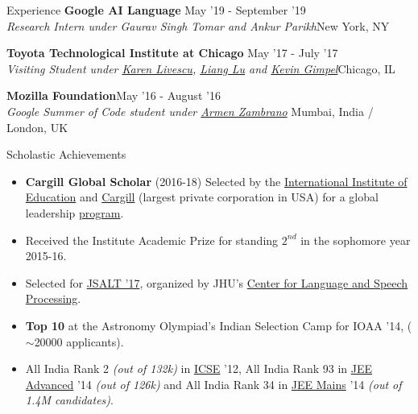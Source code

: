 \documentclass{resume} %
\begin{document}
\vspace*{-1.5mm}
\begin{rSection}{Experience}
{\bf Google AI Language}{ \hfill May '19 - September '19}\\ \textit{Research Intern under Gaurav Singh Tomar and Ankur Parikh}{\hfill New York, NY}

{\bf Toyota Technological Institute at Chicago}{ \hfill May '17 - July '17}\\ \textit{Visiting Student under \href{http://ttic.uchicago.edu/~klivescu/}{Karen Livescu}, \href{http://ttic.uchicago.edu/~llu/}{Liang Lu} and \href{http://ttic.uchicago.edu/~kgimpel/}{Kevin Gimpel}}{\hfill Chicago, IL}

{\bf Mozilla Foundation}{\hfill May '16 - August '16} \\ \textit{Google Summer of Code student under \href{https://github.com/armenzg}{Armen Zambrano}}{ \hfill Mumbai, India / London, UK}
\end{rSection}
\pagebreak 
\begin{rSection}{Scholastic Achievements}
\begin{itemize}[leftmargin=*]
\itemsep -0.5em 
\item \textbf{Cargill Global Scholar} (2016-18) Selected by the \href{https://en.wikipedia.org/wiki/Institute_of_International_Education}{International Institute of Education} and \href{https://en.wikipedia.org/wiki/Cargill}{Cargill} (largest private corporation in USA) for a global leadership \href{https://www.cargillglobalscholars.com/}{program}.
\item Received the Institute Academic Prize for standing $2^{nd}$ in the  sophomore year 2015-16.
\item Selected for \href{https://www.lti.cs.cmu.edu/2017-jsalt-undergraduate}{JSALT '17}, organized by JHU's \href{https://www.clsp.jhu.edu/}{Center for Language and Speech Processing}\footnotemark[2]. 
\item \textbf{Top 10} at the Astronomy Olympiad's Indian Selection Camp for IOAA '14, ($\sim$20000 applicants).
\item All India Rank 2 \textit{(out of 132k)} in \href{https://en.wikipedia.org/wiki/Indian_Certificate_of_Secondary_Education}{ICSE} '12, All India Rank 93 in \href{https://en.wikipedia.org/wiki/Joint_Entrance_Examination}{JEE Advanced} '14 \textit{(out of 126k)} and All India Rank 34 in \href{https://en.wikipedia.org/wiki/Joint_Entrance_Examination}{JEE Mains} '14 \textit{(out of 1.4M candidates)}.
\end{itemize}
\end{rSection}
\end{document}
